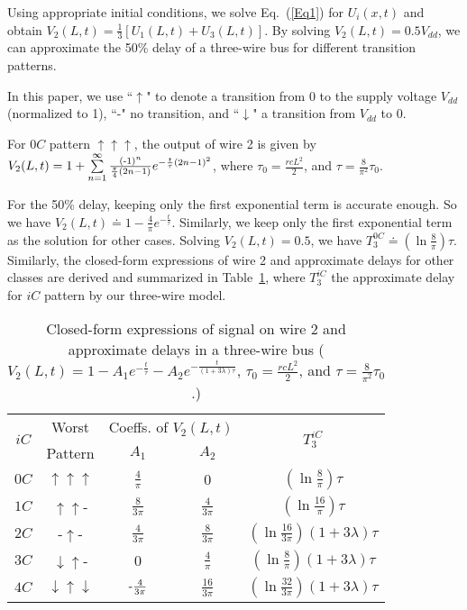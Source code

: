 \documentclass[10pt,journal]{IEEEtran}
\def\d{\downarrow}
\def\u{\uparrow}
\begin{document}
Using appropriate initial conditions, we solve Eq.~(\ref{Eq1}) for $U_i(x,t)$ and obtain $V_2(L,t)=\frac{1}{3}[U_1(L,t)+U_3(L,t)]$.
By solving $V_2(L,t)=0.5V_{dd}$, we can approximate the 50\% delay of a three-wire bus for different transition patterns.


In this paper, we use ``$\uparrow$" to denote a transition from 0 to the supply voltage $V_{dd}$ (normalized to 1), ``-" no transition, and ``$\downarrow$" a transition from $V_{dd}$ to 0.

For $0C$ pattern $\u\u\u$, the output of wire 2 is given by~\cite{Sak93} $V_2(L,t)=1 + \sum\limits^\infty_{n=1}\frac{(\textnormal{-}1)^n}{\frac{\pi}{4}(2n-1)} e^{-\frac{t}{\tau}(2n-1)^2}$, where $\tau_0=\frac{rcL^2}{2}$, and $\tau=\frac{8}{\pi^2}\tau_0$.

For the 50\% delay, keeping only the first exponential term is accurate enough. So we have $V_2(L,t)\doteq 1- \frac{4}{\pi}e^{-\frac{t}{\tau}}$.
Similarly, we keep only the first exponential term as the solution for other cases.
Solving $V_2(L,t)=0.5$, we have $T^{0C}_3\doteq\left(\ln{\frac{8}{\pi}}\right)\tau$.
Similarly, the closed-form expressions of wire 2 and approximate delays for other classes are derived and summarized in Table~\ref{tab:3wire}, where $T^{iC}_3$ the approximate delay for $iC$ pattern by our three-wire model.

\begin{table}[!thb]
\caption{Closed-form expressions of signal on wire 2 and approximate delays in a three-wire bus ($V_2(L,t) = 1-A_1 e^{-\frac{t}{\tau}} - A_2 e^{-\frac{t}{(1+3\lambda)\tau}}$, $\tau_0=\frac{rcL^2}{2}$, and $\tau=\frac{8}{\pi^2}\tau_0$.)}\label{tab:3wire}
\begin{center}
\begin{tabular}{|c|c|c|c|c|}
\hline
\multirow{2}{*}{$iC$} & Worst & \multicolumn{2}{|c|}{Coeffs. of $V_2(L,t)$} & \multirow{2}{*}{$T_3^{iC}$}\\
\cline{3-4}
& Pattern & $A_1$ & $A_2$ & \\
\hline
$0C$ & $\u\u\u$ & $\frac{4}{\pi}$ & 0 & $\left(\ln{\frac{8}{\pi}}\right)\tau$ \\
\hline
$1C$ & $\u\u$- & $\frac{8}{3\pi}$ & $\frac{4}{3\pi}$ & $\left(\ln{\frac{16}{\pi}}\right)\tau$\\
\hline
$2C$ & -$\u$- & $\frac{4}{3\pi}$ & $\frac{8}{3\pi}$ & $\left(\ln{\frac{16}{3\pi}}\right)(1+3\lambda)\tau$ \\
\hline
$3C$ & $\d\u$- & 0 & $\frac{4}{\pi}$ & $\left(\ln{\frac{8}{\pi}}\right)(1+3\lambda)\tau$ \\
\hline
$4C$ & $\d\u\d$ & $\textnormal{-}\frac{4}{3\pi}$ & $\frac{16}{3\pi}$ & $\left(\ln{\frac{32}{3\pi}}\right)(1+3\lambda)\tau$ \\
\hline
\end{tabular}
\end{center}
\end{table}
\end{document}
